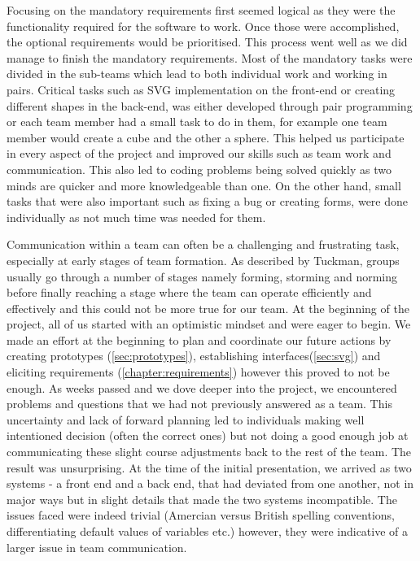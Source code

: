 \documentclass[a4paper]{report}
\begin{document}
	
	\par Focusing on the mandatory requirements first seemed logical as they were the functionality required for the software to work. Once those were accomplished, the optional requirements would be prioritised. This process went well as we did manage to finish the mandatory requirements. Most of the mandatory tasks were divided in the sub-teams which lead to both individual work and working in pairs. Critical tasks such as SVG implementation on the front-end or creating different shapes in the back-end, was either developed through pair programming or each team member had a small task to do in them, for example one team member would create a cube and the other a sphere. This helped us participate in every aspect of the project and improved our skills such as  team work and communication. This also led  to coding problems being solved quickly as two minds are quicker and more knowledgeable than one. On the other hand, small tasks that were also important such as fixing a bug or creating forms, were done individually as not much time was needed for them.  \newline
	
	\par Communication within a team can often be a challenging and frustrating task, especially at early stages of team formation. As described by Tuckman, groups usually go through a number of stages namely forming, storming and norming before finally reaching a stage where the team can operate efficiently and effectively \cite{tuckman_development_1965} and this could not be more true for our team. At the beginning of the project, all of us started with an optimistic mindset and were eager to begin. We made an effort at the beginning to plan and coordinate our future actions by creating prototypes (\ref{sec:prototypes}), establishing interfaces(\ref{sec:svg}) and eliciting requirements (\ref{chapter:requirements}) however this proved to not be enough. As weeks passed and we dove deeper into the project, we encountered problems and questions that we had not previously answered as a team. This uncertainty and lack of forward planning led to individuals making well intentioned decision (often the correct ones) but not doing a good enough job at communicating these slight course adjustments back to the rest of the team. The result was unsurprising. At the time of the initial presentation, we arrived as two systems - a front end and a back end, that had deviated from one another, not in major ways but in slight details that made the two systems incompatible. The issues faced were indeed trivial (Amercian versus British spelling conventions, differentiating default values of variables etc.) however, they were indicative of a larger issue in team communication.\newline
	
\end{document}
